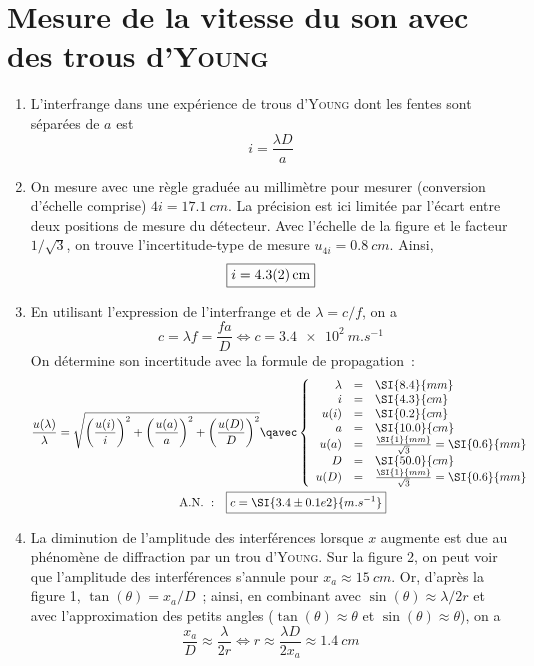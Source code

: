 \documentclass[a4paper, 12pt, final, garamond]{book}
\begin{document}
\section{Mesure de la vitesse du son avec des trous d'\textsc{Young}}
\begin{enumerate}
    \item L'interfrange dans une expérience de trous d'\textsc{Young} dont les
        fentes sont séparées de $a$ est
        \[\boxed{i = \frac{\lambda D}{a}}\]
    \item On mesure avec une règle graduée au millimètre pour mesurer
        (conversion d'échelle comprise) $4i = \SI{17.1}{cm}$. La précision
        est ici limitée par l'écart entre deux positions de mesure du
        détecteur. Avec l'échelle de la figure et le facteur $1/\sqrt{3}$, on
        trouve l'incertitude-type de mesure $u_{4i} = \SI{0.8}{cm}$. Ainsi,
        \[\boxed{i = \SI{4.3\pm0.2}{cm}}\]
    \item En utilisant l'expression de l'interfrange et de $\lambda = c/f$, on a
        \[
            c = \lambda f = \frac{fa}{D}
            \Leftrightarrow
            c = \SI{3.4e2}{m.s^{-1}}
        \]
        On détermine son incertitude avec la formule de propagation~:
        \begin{gather*}
            \frac{u(\lambda)}{\lambda}
            = \sqrt{\left(\frac{u(i)}{i}\right)^2 +
                \left(\frac{u(a)}{a}\right)^2 +
                \left(\frac{u(D)}{D}\right)^2}
            \qavec
            \left\{
                \begin{array}{rcl}
                    \lambda & = & \SI{8.4}{mm}\\
                    i       & = & \SI{4.3}{cm}\\
                    u(i)    & = & \SI{0.2}{cm}\\
                    a       & = & \SI{10.0}{cm}\\
                    u(a)    & = & \frac{\SI{1}{mm}}{\sqrt{3}} = \SI{0.6}{mm}\\
                    D       & = & \SI{50.0}{cm}\\
                    u(D)    & = & \frac{\SI{1}{mm}}{\sqrt{3}} = \SI{0.6}{mm}
                \end{array}
            \right.\\
            \mathrm{A.N.~:}\quad
            \boxed{c = \SI{3.4\pm0.1e2}{m.s^{-1}}}
        \end{gather*}
    \item La diminution de l'amplitude des interférences lorsque $x$ augmente
        est due au phénomène de diffraction par un trou d'\textsc{Young}. Sur la
        figure 2, on peut voir que l'amplitude des interférences s'annule pour
        $x_a \approx \SI{15}{cm}$. Or, d'après la figure 1, $\tan(\theta) =
        x_a/D$~; ainsi, en combinant avec $\sin(\theta) \approx \lambda/2r$ et
        avec l'approximation des petits angles ($\tan(\theta) \approx \theta$ et
        $\sin(\theta) \approx \theta$), on a
        \[
            \frac{x_a}{D} \approx \frac{\lambda}{2r}
            \Leftrightarrow
            \boxed{r \approx \frac{\lambda D}{2x_a} \approx \SI{1.4}{cm}}
        \]
\end{enumerate}
\end{document}
